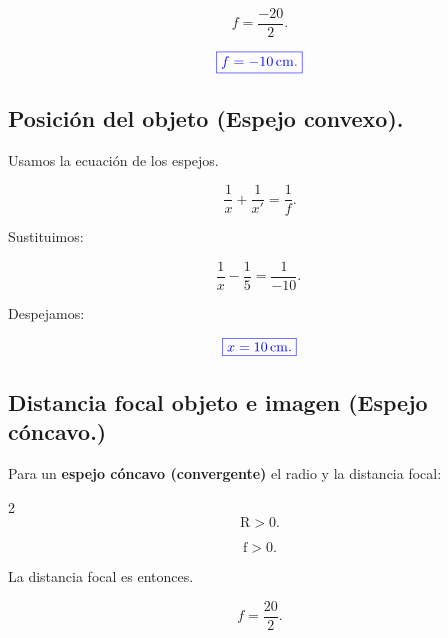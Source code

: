 \documentclass[a4paper,12pt]{article} %
\begin{document}
\[ f = \frac{-20}{2}. \]

\vspace{\baselineskip}

\[ \textcolor{blue}{\boxed{f = -10 \, \mathrm{cm}.}} \]

\vspace{\baselineskip}

\subsection{Posición del objeto (Espejo convexo).}

\vspace{\baselineskip}

\begin{justify}
	Usamos la ecuación de los espejos.
\end{justify}

\[ \frac{1}{x} + \frac{1}{x'} = \frac{1}{f}. \]

\begin{justify}
	Sustituimos:
\end{justify}

\[ \frac{1}{x} - \frac{1}{5} = \frac{1}{-10}. \ \]

\begin{justify}
	Despejamos:
\end{justify}

\[ \textcolor{blue}{\boxed{x = 10 \, \mathrm{cm}.}} \]

\vspace{\baselineskip}

\subsection{Distancia focal objeto e imagen (Espejo cóncavo.)}

\begin{justify}
	Para un \textbf{espejo cóncavo (convergente)} el radio y la distancia focal:
\end{justify}

\begin{multicols}{2}
	\[\mathrm{R > 0}.\]
	
	\[\mathrm{f > 0}.\]
\end{multicols}

\begin{justify}
	La distancia focal es entonces.
\end{justify}

\[ f = \frac{20}{2}. \]
\end{document}
